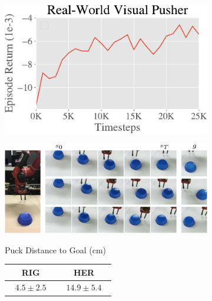 \begin{figure}[ht!]
    \centering
    \begin{subfigure}[b]{0.28\textwidth}
        \includegraphics[width=1\linewidth]{rig/img/pusher_learning_curve-crop.pdf}
    \end{subfigure}
    \begin{subfigure}[b]{0.4\textwidth}
        \includegraphics[width=1\linewidth]{rig/img/real_pusher_rollouts.pdf}
    \end{subfigure}
    \begin{subfigure}[b]{0.3\textwidth}
        \begin{flushright}
            \small{Puck Distance to Goal (cm)} \\
            \vspace{0cm}           
            {\renewcommand{\arraystretch}{1.2}%
            \begin{tabular}{  c | c }
             \hline
               $\quad\,$ RIG $\quad \,$ & $\quad\,$ HER $\quad\,$ \\ \hline
                $\mathbf{4.5 \pm 2.5}$ & $14.9 \pm 5.4$  \\

\end{tabular}}
\end{flushright}
\end{subfigure}
\end{figure}
